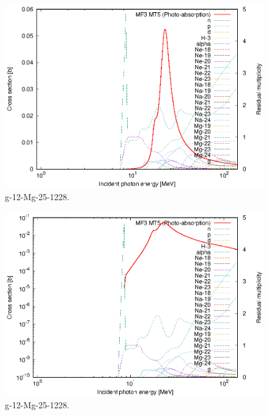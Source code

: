 \begin{figure}
 \includegraphics[width=\linewidth]{eps/g_12-Mg-25_1228.eps}
  \caption{g-12-Mg-25-1228.}
\end{figure}
\begin{figure}
 \includegraphics[width=\linewidth]{eps-log/g_12-Mg-25_1228.eps}
 \caption{g-12-Mg-25-1228.}
\end{figure}
\newpage \clearpage

